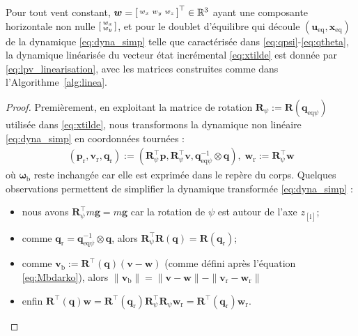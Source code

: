 \begin{theorem} \label{th:lin}
Pour tout vent constant, $\boldsymbol{w} =\left[ \begin{smallmatrix}w_x & w_y & w_z \end{smallmatrix} \right]^\top \in {\mathbb R}^3$ ayant une composante horizontale non nulle $\left[ \begin{smallmatrix}w_x \\ w_y \end{smallmatrix} \right]$, et pour le doublet d'équilibre qui découle $(\boldsymbol{u}_{\text{eq}}, \boldsymbol{x}_{\text{eq}})$ de la dynamique \eqref{eq:dyna_simp} telle que caractérisée dans \eqref{eq:qpsi}-\eqref{eq:qtheta}, la dynamique linéarisée du vecteur état incrémental \eqref{eq:xtilde} est donnée par \eqref{eq:lpv_linearisation}, avec les matrices construites comme dans l'Algorithme~\ref{alg:linea}.
\end{theorem}
%
\begin{proof}
Premièrement, en exploitant la matrice de rotation 
$\boldsymbol{R}_{\psi} :=    \boldsymbol{R}(\boldsymbol{q}_{\mathrm{eq}\psi})$ utilisée dans \eqref{eq:xtilde}, nous transformons la dynamique non linéaire \eqref{eq:dyna_simp} en coordonnées tournées : 
\begin{align}
\label{eq:rotated_coord}
(\boldsymbol{p}_{\text{r}} ,
\boldsymbol{v}_{\text{r}} ,
\boldsymbol{q}_{\text{r}}
)
:=
\left(\boldsymbol{R}_{\psi}^\top
\boldsymbol{p},
\boldsymbol{R}_{\psi}^\top \boldsymbol{v},
\boldsymbol{q}_{\mathrm{eq}\psi}^{-1} \otimes
\boldsymbol{q}
\right), 
\; \boldsymbol{w}_{\text{r}}:=\boldsymbol{R}_{\psi}^\top\boldsymbol{w}
\end{align}
où $\boldsymbol{\omega}_{\text{b}}$ reste inchangée car elle est exprimée dans le repère du corps. 
Quelques observations permettent de simplifier
la dynamique transformée \eqref{eq:dyna_simp} :
\begin{itemize}
    \item nous avons $\boldsymbol{R}_{\psi}^\top
    m\boldsymbol{g} = m\boldsymbol{g}$ car la rotation de $\psi$ est autour de l'axe $z_{[\text{i}]}$;
    \item comme $\boldsymbol{q}_{\text{r}} = \boldsymbol{q}_{\mathrm{eq}\psi}^{-1} \otimes \boldsymbol{q}$, alors $\boldsymbol{R}_{\psi}^\top \boldsymbol{R}(\boldsymbol{q}) = \boldsymbol{R}(\boldsymbol{q}_{\text{r}})$; 
    \item comme $\boldsymbol{v}_{\text{b}} := \boldsymbol{R}^\top(\boldsymbol{q}) (\boldsymbol{v}-\boldsymbol{w})$ (comme défini après l'équation \eqref{eq:Mbdarko}), alors $\| \boldsymbol{v}_{\text{b}} \| = \| \boldsymbol{v} -  \boldsymbol{w}  \| - \| \boldsymbol{v}_{\text{r}} -  \boldsymbol{w}_{\text{r}}  \|$
    \item enfin $\boldsymbol{R}^\top(\boldsymbol{q}) \boldsymbol{w} = \boldsymbol{R}^\top\! (\boldsymbol{q}_{\text{r}}) \boldsymbol{R}_{\psi}^\top\! \boldsymbol{R}_{\psi} \boldsymbol{w}_{\text{r}}= \boldsymbol{R}^\top \!(\boldsymbol{q}_{\text{r}}) \boldsymbol{w}_{\text{r}}$.
\end{itemize} 


\end{proof}

